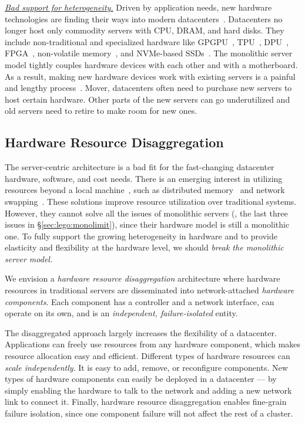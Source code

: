 \textit{\uline{Bad support for heterogeneity.}}
Driven by application needs, new hardware technologies are finding their ways into modern datacenters~\cite{sigarch-dc}.
Datacenters no longer host only commodity servers with CPU, DRAM, and hard disks. 
They include non-traditional and specialized hardware like GPGPU~\cite{GPU-google,GPU-aws}, 
TPU~\cite{TPU}, 
DPU~\cite{DPU},
FPGA~\cite{Putnam14-FPGA,Amazon-F1}, %
non-volatile memory~\cite{Intel3DXpoint}, %
and NVMe-based SSDs~\cite{everspin}.
The monolithic server model tightly couples hardware devices with each other and with a motherboard.
As a result, making new hardware devices work with existing servers is a painful and lengthy process~\cite{Putnam14-FPGA}.
Mover, datacenters often need to purchase new servers to host certain hardware.
Other parts of the new servers can go underutilized 
and old servers need to retire to make room for new ones.

\subsection{Hardware Resource Disaggregation}
The server-centric architecture is a bad fit for the fast-changing datacenter hardware, software, and cost needs.
There is an emerging interest in utilizing resources beyond a local machine~\cite{Gao16-OSDI},
such as distributed memory~\cite{Dragojevic14-FaRM,Nelson15-ATC,Aguilera17-SOCC,Novakovic16-SOCC} and network swapping~\cite{GU17-NSDI}. 
These solutions improve resource utilization over traditional systems.
However, they cannot solve all the issues of monolithic servers (\eg, the last three issues in \S\ref{sec:lego:monolimit}), 
since their hardware model is still a monolithic one.
To fully support the growing heterogeneity in hardware and to provide elasticity and flexibility at the hardware level, 
we should {\em break the monolithic server model.}%

We envision a {\em hardware resource disaggregation} architecture 
where hardware resources in traditional servers are disseminated into network-attached {\em hardware components}.
Each component has a controller and a network interface,
can operate on its own,
and is an {\em independent, failure-isolated} entity.

The disaggregated approach largely increases the flexibility of a datacenter.
Applications can freely use resources from any hardware component,
which makes resource allocation easy and efficient.
Different types of hardware resources can {\em scale independently}.
It is easy to add, remove, or reconfigure components.
New types of hardware components can easily be deployed in a datacenter ---
by simply enabling the hardware to talk to the network and adding a new network link to connect it.
Finally, hardware resource disaggregation enables fine-grain failure isolation, %
since one component failure will not affect the rest of a cluster.

